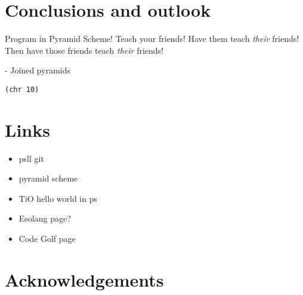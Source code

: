 \documentclass[aip,jcp,reprint]{revtex4-1}
\newcommand{\ilpsll}[1]{\lstinline[language=psll,columns=flexible]{#1}}
\begin{document}
\section{Conclusions and outlook}
Program in Pyramid Scheme! Teach your friends! Have them teach \emph{their} friends! Then have those friends teach \emph{their} friends!

- Joined pyramids


\lipsum[11-15]
\ilpsll{(chr 10)}

\section*{Links}
\begin{itemize}
\item psll git
\item pyramid scheme
\item TiO hello world in ps
\item Esolang page?
\item Code Golf page
\end{itemize}

\section*{Acknowledgements}
 
\nocite{*}

\end{document}

